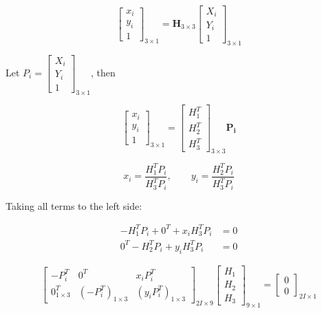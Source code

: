 \documentclass{article}
\begin{document}
\begin{equation}
    \begin{bmatrix}
    x_i \\ y_i \\ 1
    \end{bmatrix}_{3\times1} = \mathbf{H}_{3\times3}
    \begin{bmatrix}
    X_i \\ Y_i \\ 1
    \end{bmatrix}_{3\times1}
\end{equation}

Let $P_i = \begin{bmatrix} X_i \\ Y_i \\ 1 \end{bmatrix}_{3 \times 1}$, then


\begin{equation}
    \begin{bmatrix}
    x_i \\ y_i \\ 1
    \end{bmatrix}_{3\times1} = \begin{bmatrix}H_{1}^{T} \\ H_{2}^{T} \\ H_{3}^{T}\end{bmatrix}_{3\times3}
    \mathbf{P_i}
\end{equation}

\begin{equation}
    x_i = \frac{H_{1}^{T} P_i}{H_{3}^{T} P_i},\qquad
    y_i = \frac{H_{2}^{T} P_i}{H_{3}^{T} P_i}
\end{equation}

Taking all terms to the left side:

\begin{align}
    -H_{1}^T P_i + 0^T + x_i H_{3}^T P_i &= 0 \\
    0^T - H_2^T P_i + y_i H_{3}^T P_i &= 0
\end{align}

\begin{equation}
    \begin{bmatrix}
    -P_{i}^T & 0^T & x_i P_{i}^T \\
    0^T_{1\times3} & (-P_i^T)_{1\times3} & (y_i P_{i}^T)_{1\times3}
    \end{bmatrix}_{2 \mathit{I}\times9}
    \begin{bmatrix}
    H_{1} \\ H_{2} \\ H_{3}
    \end{bmatrix}_{9\times1} = \begin{bmatrix}
    0 \\ 0
    \end{bmatrix}_{2 \mathit{I}\times1}
\end{equation}
\end{document}
